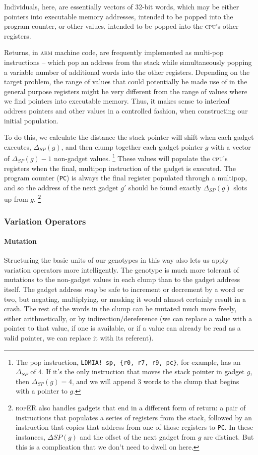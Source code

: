 Individuals, here, are essentially vectors of 32-bit words, which
may be either pointers into executable memory addresses, intended
to be popped into the program counter, or other values, intended
to be popped into the \textsc{cpu}'s other registers. 

Returns, in \textsc{arm} machine code, are frequently implemented as
multi-pop instructions -- which pop an address from the stack
while simultaneously popping a variable number of additional
words into the other registers. Depending on the target problem, the range of values that could potentially be
made use of in the general purpose registers might be very
different from the range of values where we find pointers into
executable memory. Thus, it makes sense to interleaf address
pointers and other values in a controlled fashion, when
constructing our initial population. 

To do this, we calculate the distance the stack pointer will shift
when each gadget executes, $\Delta_{SP}(g)$, and then clump
together each gadget pointer $g$ with a vector of
$\Delta_{SP}(g)-1$ non-gadget values.%
\footnote{The pop instruction, \texttt{LDMIA! sp, \{r0, r7, 
  r9, pc\}},
  for example, has an $\Delta_{SP}$ of 4. If it's the only
  instruction that moves the stack pointer in gadget $g$, then
  $\Delta_{SP}(g) = 4$, and we will append 3 words to the clump
  that begins with a pointer to $g$.}
These values will populate
the \textsc{cpu}'s registers when the final, multipop instruction of the
gadget is executed. The program counter (\texttt{PC}) is always
the final register populated through a multipop, and so the
address of the next gadget $g'$ should be found exactly
$\Delta_{SP}(g)$ slots up from $g$.%
\footnote{\textsc{rop}ER also handles gadgets that end in a different
  form of return: a pair of instructions that populates a series
  of registers from the stack, followed by an instruction that
  copies that address from one of those registers to \texttt{PC}.
  In these instances, $\Delta{SP}(g)$ and the offset of the next
  gadget from $g$ are distinct. But this is a complication that
  we don't need to dwell on here.}

\subsubsection{Variation Operators}
\paragraph{Mutation}
Structuring the basic units of our genotypes in this way also
lets us apply variation operators more intelligently. The
genotype is much more tolerant of mutations to the non-gadget
values in each clump than to the gadget address itself. The
gadget address \emph{may} be safe to increment or decrement by a
word or two, but negating, multiplying, or masking it would
almost certainly result in a crash. The rest of the words in the
clump can be mutated much more freely, either arithmetically, or
by indirection/dereference (we can replace a value with a pointer
to that value, if one is available, or if a value can already be
read as a valid pointer, we can replace it with its referent).

